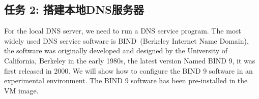 \begin{comment}
To avoid this, we should tell the DHCP client not to set the
DNS server automatically. This can be achieved using the following procedure (for \ubuntu
16.04):


\begin{enumerate}
  \item Go to \texttt{"System Settings"}, and click the \texttt{"Network"} icon.
  \item Choose the \texttt{"Wired"} tab, and click the
        \texttt{"Options"} button. A dialog will pop up.

  \item Click the \texttt{ "IPv4 Settings"} tab.  In the \texttt{"Method"} entry, choose
        \texttt{"Automatic (DHCP) Addresses Only"}, and then type the IP address of the local DNS
        server in the \texttt{"DNS servers"} entry. We do not need to type anything in the
        other two fields~(See Figure~\ref{dns:fig:user_machine_setup}).

  \item Finally, click the network icon on the top right corner of the desktop, and Select
    \texttt{"Wired connection 1"}. This will refresh the wired network connection and updates the changes.
    It should be noted that \texttt{"Wired connection 1"} is the name that we choose for our
    connection (see Figure~\ref{dns:fig:user_machine_setup});  we can choose a
    different name.
\end{enumerate}


\begin{figure}[htb]
  \begin{center}
    \texttt{[image: \\dnsFigs/config\_local\_dns\_server.pdf]}
  \end{center}
  \caption{User machine setup}
  \label{dns:fig:user_machine_setup}
\end{figure}

\end{comment}


\subsection{任务 2: 搭建本地DNS服务器}

For the local DNS server, we need to run a DNS service program. The most widely used DNS service software is BIND~(Berkeley Internet Name
Domain), the software was originally developed and designed by the University of California, Berkeley in the early 1980s, the latest version
Named BIND 9, it was first released in 2000. We will show how to configure the BIND 9 software in an experimental environment.
The BIND 9 software has been pre-installed in the \ubuntu VM image.


